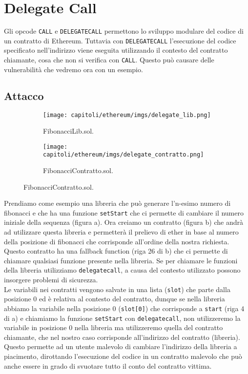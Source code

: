 \section{Delegate Call}

Gli opcode \verb|CALL| e \verb|DELEGATECALL| permettono lo sviluppo modulare del codice di un contratto di Ethereum.
Tuttavia con \verb|DELEGATECALL| l'esecuzione del codice specificato nell'indirizzo viene eseguita utilizzando il contesto del contratto chiamante,
cosa che non si verifica con \verb|CALL|.
Questo può causare delle vulnerabilità che vedremo ora con un esempio.

\subsection{Attacco}

\begin{figure}[H]
      \centering
      \begin{subfigure}[b]{.5\textwidth}
            \centering
            \texttt{[image: capitoli/ethereum/imgs/delegate\_lib.png]}
            \caption{FibonacciLib.sol.}
      \end{subfigure}%
      \begin{subfigure}[b]{.5\textwidth}
            \centering
            \texttt{[image: capitoli/ethereum/imgs/delegate\_contratto.png]}
            \caption{FibonacciContratto.sol.}
      \end{subfigure}
\end{figure}

Prendiamo come esempio una libreria che può generare l'n-esimo numero di fibonacci
e che ha una funzione \verb|setStart| che ci permette di cambiare il numero
iniziale della sequenza (figura a).
Ora creiamo un contratto (figura b) che andrà ad utilizzare questa libreria e
permetterà il prelievo di ether in base al numero della posizione di fibonacci
che corrisponde all'ordine della nostra richiesta.
Questo contratto ha una fallback function (riga 26 di b)
che ci permette di chiamare qualsiasi funzione presente nella libreria.
Se per chiamare le funzioni della libreria utilizziamo \verb|delegatecall|,
a causa del contesto utilizzato possono insorgere problemi di sicurezza.\\
Le variabili nei contratti vengono salvate in una lista (\verb|slot|)
che parte dalla posizione $0$ ed è relativa al contesto del contratto,
dunque se nella libreria abbiamo la variabile nella posizione $0$ (\verb|slot[0]|)
che corrisponde a \verb|start| (riga 4 di a) e chiamiamo la funzione
\verb|setStart| con \verb|delegatecall|, non utilizzeremo la variabile in
posizione $0$ nella libreria ma utilizzeremo quella del contratto chiamante,
che nel nostro caso corrisponde all'indirizzo del contratto (libreria).
Questo permette ad un utente malevolo di
cambiare l'indirizzo della libreria a piacimento, dirottando l'esecuzione
del codice in un contratto malevolo che può anche essere in grado di svuotare
tutto il conto del contratto vittima.

